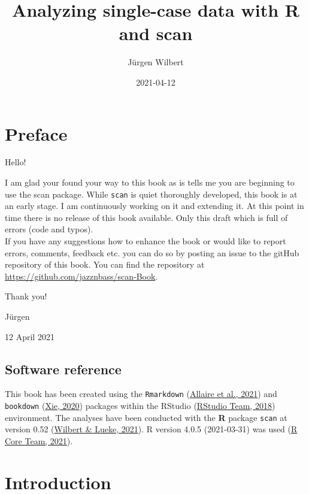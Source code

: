 \documentclass[
]{book}
\title{Analyzing single-case data with R and scan}
\author{Jürgen Wilbert}
\date{2021-04-12}
\begin{document}
\maketitle

{
\setcounter{tocdepth}{1}
\tableofcontents
}
\hypertarget{preface}{%
\chapter*{Preface}\label{preface}}

Hello!

I am glad your found your way to this book as is tells me you are beginning to use the scan package. While \texttt{scan} is quiet thoroughly developed, this book is at an early stage. I am continuously working on it and extending it. At this point in time there is no release of this book available. Only this draft which is full of errors (code and typos).\\
If you have any suggestions how to enhance the book or would like to report errors, comments, feedback etc. you can do so by posting an issue to the gitHub repository of this book. You can find the repository at \url{https://github.com/jazznbass/scan-Book}.

Thank you!

Jürgen

12 April 2021

\hypertarget{software-reference}{%
\section*{Software reference}\label{software-reference}}

This book has been created using the \texttt{Rmarkdown} (\protect\hyperlink{ref-R-rmarkdown}{Allaire et al., 2021}) and \texttt{bookdown} (\protect\hyperlink{ref-R-bookdown}{Xie, 2020}) packages within the RStudio (\protect\hyperlink{ref-RStudio}{RStudio Team, 2018}) environment. The analyses have been conducted with the \textbf{R} package \texttt{scan} at version 0.52 (\protect\hyperlink{ref-R-scan}{Wilbert \& Lueke, 2021}). R version 4.0.5 (2021-03-31) was used (\protect\hyperlink{ref-R-base}{R Core Team, 2021}).

\hypertarget{introduction}{%
\chapter{Introduction}\label{introduction}}
\end{document}
